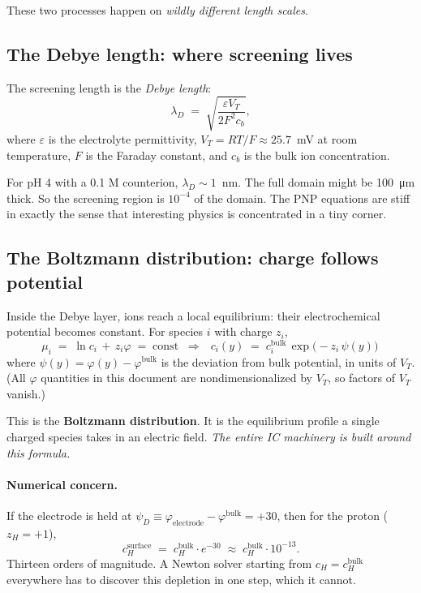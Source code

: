 \documentclass[11pt]{article}
\newcommand{\VT}{V_{T}}
\newcommand{\lD}{\lambda_D}
\begin{document}
These two processes happen on \emph{wildly different length scales}.

\subsection{The Debye length: where screening lives}

The screening length is the \emph{Debye length}:
\begin{equation}
  \lD \;=\; \sqrt{\frac{\varepsilon \VT}{2 F^2 c_b}},
\end{equation}
where $\varepsilon$ is the electrolyte permittivity, $\VT = RT/F
\approx 25.7$~mV at room temperature, $F$ is the Faraday constant, and
$c_b$ is the bulk ion concentration.

For pH 4 with a 0.1 M counterion, $\lD \sim 1$~nm. The full domain
might be \SI{100}{\micro\meter} thick. So the screening region is
$10^{-4}$ of the domain. The PNP equations are stiff in exactly the
sense that interesting physics is concentrated in a tiny corner.

\subsection{The Boltzmann distribution: charge follows potential}

Inside the Debye layer, ions reach a local equilibrium: their
electrochemical potential becomes constant. For species $i$ with
charge $z_i$,
\begin{equation}
  \mu_i \;=\; \ln c_i \,+\, z_i \varphi \;=\; \mathrm{const}
  \;\;\Longrightarrow\;\;
  \boxed{\,c_i(y) \;=\; c_i^{\mathrm{bulk}}\,\exp\bigl(-z_i\,\psi(y)\bigr)\,}
\end{equation}
where $\psi(y) = \varphi(y) - \varphi^{\mathrm{bulk}}$ is the
deviation from bulk potential, in units of $\VT$. (All $\varphi$
quantities in this document are nondimensionalized by $\VT$, so
factors of $\VT$ vanish.)

This is the \textbf{Boltzmann distribution}. It is the equilibrium
profile a single charged species takes in an electric field. \emph{The
entire IC machinery is built around this formula.}

\paragraph{Numerical concern.} If the electrode is held at
$\psi_D \equiv \varphi_{\mathrm{electrode}} - \varphi^{\mathrm{bulk}}
= +30$, then for the proton ($z_H = +1$),
\begin{equation*}
  c_H^{\mathrm{surface}}
   \;=\; c_H^{\mathrm{bulk}} \cdot e^{-30}
   \;\approx\; c_H^{\mathrm{bulk}} \cdot 10^{-13}.
\end{equation*}
Thirteen orders of magnitude. A Newton solver starting from
$c_H = c_H^{\mathrm{bulk}}$ everywhere has to discover this depletion
in one step, which it cannot.
\end{document}
